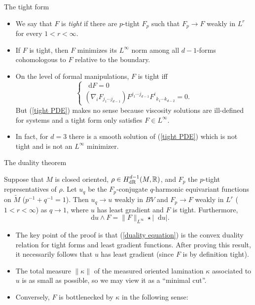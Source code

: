 \documentclass[10pt]{beamer}
\newcommand{\RR}{\mathbb{R}}
\newcommand*\dif{\mathop{}\!\mathrm{d}}
\begin{document}
\begin{frame}{The tight form}
\begin{itemize}
\item We say that $F$ is \emph{tight} if there are $p$-tight $F_p$ such that $F_p \to F$ weakly in $L^r$ for every $1 < r < \infty$. \pause
\item If $F$ is tight, then $F$ minimizes its $L^\infty$ norm among all $d - 1$-forms cohomologous to $F$ relative to the boundary. \pause
\item On the level of formal manipulations, $F$ is tight iff
\begin{equation}\label{tight PDE}
\begin{cases}
\dif F = 0 \\
(\nabla_i F_{j_1 \cdots j_{d - 1}}) F^{j_1 \cdots j_{d - 1}} {F^i}_{k_1 \cdots k_{d - 2}} = 0.
\end{cases}
\end{equation}
But (\ref{tight PDE}) makes no sense because viscosity solutions are ill-defined for systems and a tight form only satisfies $F \in L^\infty$. \pause 
\item In fact, for $d = 3$ there is a smooth solution of (\ref{tight PDE}) which is not tight and is not an $L^\infty$ minimizer.
\end{itemize}
\end{frame}

\begin{frame}{The duality theorem}
\begin{theorem}[B, in preparation]
Suppose that $M$ is closed oriented, $\rho \in H^{d - 1}_{\rm dR}(M, \RR)$, and $F_p$ the $p$-tight representatives of $\rho$.
Let $u_q$ be the $F_p$-conjugate $q$-harmonic equivariant functions on $\tilde M$ ($p^{-1} + q^{-1} = 1$).
Then $u_q \to u$ weakly in $BV$ and $F_p \to F$ weakly in $L^r$ ($1 < r < \infty$) as $q \to 1$, where $u$ has least gradient and $F$ is tight. 
Furthermore, 
\begin{equation}\label{duality equation}
\dif u \wedge F = \|F\|_{L^\infty} \star |\dif u|.
\end{equation}
\end{theorem} \pause

\begin{itemize}
\item The key point of the proof is that (\ref{duality equation}) is the convex duality relation for tight forms and least gradient functions. After proving this result, it necessarily follows that $u$ has least gradient (since $F$ is by definition tight). \pause
\item The total measure $\|\kappa\|$ of the measured oriented lamination $\kappa$ associated to $u$ is as small as possible, so we may view it as a ``minimal cut''. \pause
\item Conversely, $F$ is bottlenecked by $\kappa$ in the following sense:
\end{itemize}
\end{frame}
\end{document}

